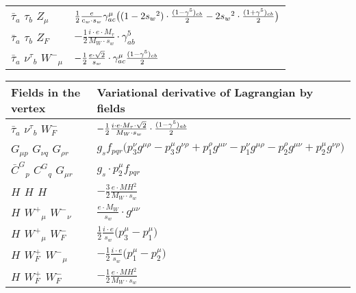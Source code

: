 \begin{center}
\begin{tabular}{|l|l|}
$\bar{\tau}{}_{a }$ \phantom{-} $\tau{}_{b }$ \phantom{-} ${Z}_{\mu }$ \phantom{-}  &
	$\frac{1}{2}\frac{ e}{ c_w \cdot s_w}\gamma_{a c}^\mu \big( (1-2 s_w {}^2)\cdot {(1-\gamma^5)_{c b}\over 2} -2 s_w{}^2 \cdot {(1+\gamma^5)_{c b}\over 2} \big)$\\[2mm]
$\bar{\tau}{}_{a }$ \phantom{-} $\tau{}_{b }$ \phantom{-} $Z_F{}_{}$ \phantom{-}  &
	$-\frac{1}{2}\frac{ i \cdot e \cdot M_\tau}{ M_W \cdot s_w}\cdot \gamma_{a b}^5 $\\[2mm]
$\bar{\tau}{}_{a }$ \phantom{-} $\nu^\tau{}_{b }$ \phantom{-} $W^-{}_{\mu }$ \phantom{-}  &
	$-\frac{1}{2}\frac{ e \cdot\sqrt{2}}{ s_w}\cdot \gamma_{a c}^\mu {(1-\gamma^5)_{c b}\over 2} $\\ \hline
\end{tabular}

\begin{tabular}{|l|l|} \hline
Fields in the vertex & Variational derivative of Lagrangian by fields \\ \hline
$\bar{\tau}{}_{a }$ \phantom{-} $\nu^\tau{}_{b }$ \phantom{-} $W^-_F{}_{}$ \phantom{-}  &
	$-\frac{1}{2}\frac{ i \cdot e \cdot M_\tau \cdot\sqrt{2}}{ M_W \cdot s_w}\cdot {(1-\gamma^5)_{a b}\over 2} $\\[2mm]
${G}_{\mu p }$ \phantom{-} ${G}_{\nu q }$ \phantom{-} ${G}_{\rho r }$ \phantom{-}  &
	$ g_sf_{p q r} \big(p_3^\nu g^{\mu \rho} -p_3^\mu g^{\nu \rho} +p_1^\rho g^{\mu \nu} -p_1^\nu g^{\mu \rho} -p_2^\rho g^{\mu \nu} +p_2^\mu g^{\nu \rho} \big)$\\[2mm]
$\bar{C}^G{}_{p }$ \phantom{-} $C^G{}_{q }$ \phantom{-} ${G}_{\mu r }$ \phantom{-}  &
	$ g_s\cdot p_2^\mu f_{p q r} $\\[2mm]
${H}_{}$ \phantom{-} ${H}_{}$ \phantom{-} ${H}_{}$ \phantom{-}  &
	$-\frac{3}{2}\frac{ e \cdot MH{}^2 }{ M_W \cdot s_w}$\\[2mm]
${H}_{}$ \phantom{-} $W^+{}_{\mu }$ \phantom{-} $W^-{}_{\nu }$ \phantom{-}  &
	$\frac{ e \cdot M_W}{ s_w}\cdot g^{\mu \nu} $\\[2mm]
${H}_{}$ \phantom{-} $W^+{}_{\mu }$ \phantom{-} $W^-_F{}_{}$ \phantom{-}  &
	$\frac{1}{2}\frac{ i \cdot e}{ s_w}\big(p_3^\mu -p_1^\mu \big)$\\[2mm]
${H}_{}$ \phantom{-} $W^+_F{}_{}$ \phantom{-} $W^-{}_{\mu }$ \phantom{-}  &
	$-\frac{1}{2}\frac{ i \cdot e}{ s_w}\big(p_1^\mu -p_2^\mu \big)$\\[2mm]
${H}_{}$ \phantom{-} $W^+_F{}_{}$ \phantom{-} $W^-_F{}_{}$ \phantom{-}  &
	$-\frac{1}{2}\frac{ e \cdot MH{}^2 }{ M_W \cdot s_w}$\\[2mm]

\end{tabular}
\end{center}
